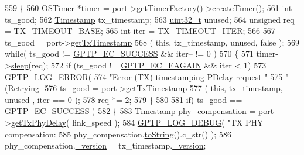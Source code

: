 \begin{DoxyCode}
559 \{
560     \hyperlink{class_o_s_timer}{OSTimer} *timer = port->\hyperlink{class_common_port_ae659108ab426a2d9e8e3c84b63ac6cdc}{getTimerFactory}()->\hyperlink{class_o_s_timer_factory_a93317f4dabe911276934eeb0a18591a5}{createTimer}();
561     \textcolor{keywordtype}{int} ts\_good;
562     \hyperlink{class_timestamp}{Timestamp} tx\_timestamp;
563     \hyperlink{parse_8c_a6eb1e68cc391dd753bc8ce896dbb8315}{uint32\_t} unused;
564     \textcolor{keywordtype}{unsigned} req = \hyperlink{avbts__message_8hpp_a65b57554e227f8a5c2c09fbb8c6d27a6}{TX\_TIMEOUT\_BASE};
565     \textcolor{keywordtype}{int} iter = \hyperlink{avbts__message_8hpp_a7b1c7bbc92831055786fc954dc7e872c}{TX\_TIMEOUT\_ITER};
566 
567     ts\_good = port->\hyperlink{class_ether_port_aa89b02ea4c3b6edddaf69fbdb03a2fe1}{getTxTimestamp}
568         ( \textcolor{keyword}{this}, tx\_timestamp, unused, \textcolor{keyword}{false} );
569     \textcolor{keywordflow}{while}( ts\_good != \hyperlink{ieee1588_8hpp_a57ed3a54df25c6db88b00f685f517920}{GPTP\_EC\_SUCCESS} && iter-- != 0 )
570     \{
571         timer->\hyperlink{class_o_s_timer_a1f92d99fa856da853c92acd11302b9cb}{sleep}(req);
572         \textcolor{keywordflow}{if} (ts\_good != \hyperlink{ieee1588_8hpp_aee74e806e4f7deb78c6adee61f5dac87}{GPTP\_EC\_EAGAIN} && iter < 1)
573             \hyperlink{gptp__log_8hpp_afefbb1009717c128012bfeed94842987}{GPTP\_LOG\_ERROR}(
574                 \textcolor{stringliteral}{"Error (TX) timestamping PDelay request "}
575                 \textcolor{stringliteral}{"(Retrying-%
576         ts\_good = port->\hyperlink{class_ether_port_aa89b02ea4c3b6edddaf69fbdb03a2fe1}{getTxTimestamp}
577             ( \textcolor{keyword}{this}, tx\_timestamp, unused , iter == 0 );
578         req *= 2;
579     \}
580 
581     \textcolor{keywordflow}{if}( ts\_good == \hyperlink{ieee1588_8hpp_a57ed3a54df25c6db88b00f685f517920}{GPTP\_EC\_SUCCESS} )
582     \{
583         \hyperlink{class_timestamp}{Timestamp} phy\_compensation = port->\hyperlink{class_common_port_a712d7ef3c08417057a911fa3fa574770}{getTxPhyDelay}( link\_speed );
584         \hyperlink{gptp__log_8hpp_ae4c6efe7c9cf6d7d3bbd28a0fd087d61}{GPTP\_LOG\_DEBUG}( \textcolor{stringliteral}{"TX PHY compensation: %
585                 phy\_compensation.\hyperlink{class_timestamp_a3f23c97b6c9f2a88e1121d1c633ccafa}{toString}().c\_str() );
586         phy\_compensation.\hyperlink{class_timestamp_a8fab72cfd922b5757580642c2309e9bd}{\_version} = tx\_timestamp.\hyperlink{class_timestamp_a8fab72cfd922b5757580642c2309e9bd}{\_version};
}}
\end{DoxyCode}
